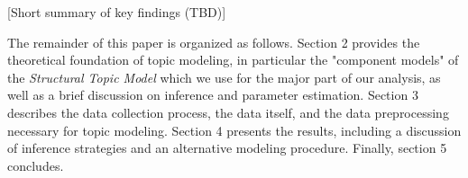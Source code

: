 \documentclass[12pt]{article}
\begin{document}
\vspace{0.5cm}
[Short summary of key findings (TBD)]
\vspace{0.5cm}

The remainder of this paper is organized as follows. Section 2 provides the theoretical foundation of topic modeling, in particular the "component models" of the \textit{Structural Topic Model} which we use for the major part of our analysis, as well as a brief discussion on inference and parameter estimation. Section 3 describes the data collection process, the data itself, and the data preprocessing necessary for topic modeling. Section 4 presents the results, including a discussion of inference strategies and an alternative modeling procedure. Finally, section 5 concludes.



\end{document}

